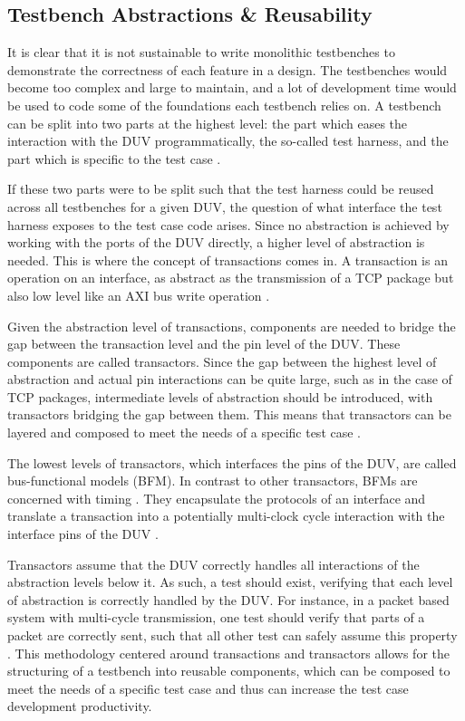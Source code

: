 \documentclass[11pt]{report}
\begin{document}
\subsection{Testbench Abstractions \& Reusability}

It is clear that it is not sustainable to write monolithic testbenches to demonstrate the correctness of each feature
in a design. The testbenches would become too complex and large to maintain, and a lot of development time would be
used to code some of the foundations each testbench relies on. A testbench can be split into two parts at the highest
level: the part which eases the interaction with the DUV programmatically, the so-called test harness, and the part
which is specific to the test case \cite[Ch. 6]{bergeron2012writing}.

If these two parts were to be split such that the test harness could be reused across all testbenches for a given
DUV, the question of what interface the test harness exposes to the test case code arises. Since no abstraction is
achieved by working with the ports of the DUV directly, a higher level of abstraction is needed. This is where the
concept of transactions comes in. A transaction is an operation on an interface, as abstract as the transmission of a
TCP package but also low level like an AXI bus write operation \cite[Ch. 1]{bergeron2005verification}.

Given the abstraction level of transactions, components are needed to bridge the gap between the transaction level
and the pin level of the DUV. These components are called transactors. Since the gap between the highest level of
abstraction and actual pin interactions can be quite large, such as in the case of TCP packages, intermediate levels
of abstraction should be introduced, with transactors bridging the gap between them. This means that transactors can
be layered and composed to meet the needs of a specific test case \cite[Ch. 4]{bergeron2012writing}.

The lowest levels of transactors, which interfaces the pins of the DUV, are called bus-functional models (BFM). In
contrast to other transactors, BFMs are concerned with timing \cite[Ch. 4]{bergeron2012writing}. They encapsulate the
protocols of an interface and translate a transaction into a potentially multi-clock cycle interaction with the
interface pins of the DUV \cite[Ch. 3]{salemi2013uvm}.

Transactors assume that the DUV correctly handles all interactions of the abstraction levels below it. As such, a
test should exist, verifying that each level of abstraction is correctly handled by the DUV. For instance, in a
packet based system with multi-cycle transmission, one test should verify that parts of a packet are correctly sent,
such that all other test can safely assume this property \cite[Ch. 6]{bergeron2012writing}. This methodology centered
around transactions and transactors allows for the structuring of a testbench into reusable components, which can be
composed to meet the needs of a specific test case and thus can increase the test case development productivity.
\end{document}
